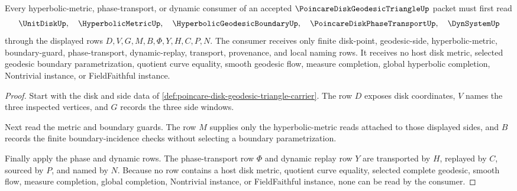 \begin{theorem}
\label{thm:poincare-disk-geodesic-triangle-phase-route}
Every hyperbolic-metric, phase-transport, or dynamic consumer of an accepted $\PoincareDiskGeodesicTriangleUp$ packet must first read
$$
\UnitDiskUp,\quad
\HyperbolicMetricUp,\quad
\HyperbolicGeodesicBoundaryUp,\quad
\PoincareDiskPhaseTransportUp,\quad
\DynSystemUp
$$
through the displayed rows $D,V,G,M,B,\Phi,Y,H,C,P,N$. The consumer receives only finite disk-point, geodesic-side, hyperbolic-metric, boundary-guard, phase-transport, dynamic-replay, transport, provenance, and local naming rows. It receives no host disk metric, selected geodesic boundary parametrization, quotient curve equality, smooth geodesic flow, measure completion, global hyperbolic completion, Nontrivial instance, or FieldFaithful instance.
\end{theorem}
\begin{proof}
Start with the disk and side data of \autoref{def:poincare-disk-geodesic-triangle-carrier}. The row $D$ exposes disk coordinates, $V$ names the three inspected vertices, and $G$ records the three side windows.

Next read the metric and boundary guards. The row $M$ supplies only the hyperbolic-metric reads attached to those displayed sides, and $B$ records the finite boundary-incidence checks without selecting a boundary parametrization.

Finally apply the phase and dynamic rows. The phase-transport row $\Phi$ and dynamic replay row $Y$ are transported by $H$, replayed by $C$, sourced by $P$, and named by $N$. Because no row contains a host disk metric, quotient curve equality, selected complete geodesic, smooth flow, measure completion, global completion, Nontrivial instance, or FieldFaithful instance, none can be read by the consumer.
\end{proof}



